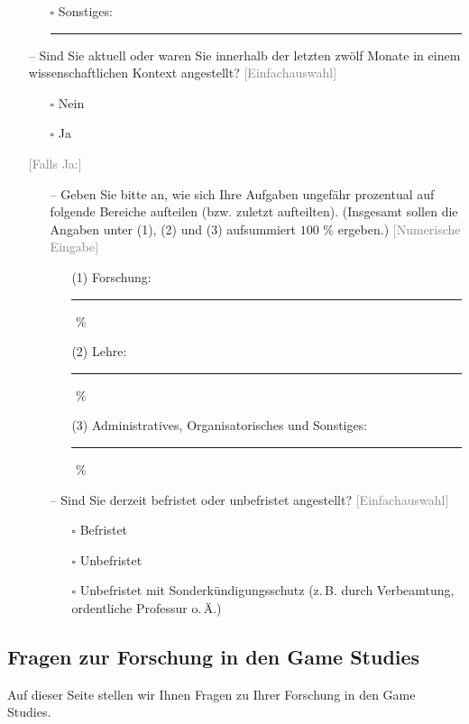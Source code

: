\documentclass{scrartcl}
\begin{document}
\begin{itemize}
\begin{itemize}
      \item[$\square$] Sonstiges:\ \rule{2cm}{0.4pt}
   \end{itemize}
   \item[--] Sind Sie aktuell oder waren Sie innerhalb der letzten zwölf Monate in einem wissenschaftlichen Kontext angestellt? \textcolor{gray}{\textsf{[Einfachauswahl]}}
   \begin{itemize}
      \item[$\square$] Nein
      \item[$\square$] Ja
   \end{itemize}
   \item[] \textcolor{gray}{\textsf{[Falls Ja:]}}
   \begin{itemize}
      \item[--] Geben Sie bitte an, wie sich Ihre Aufgaben ungefähr prozentual auf folgende Bereiche aufteilen (bzw. zuletzt aufteilten). (Insgesamt sollen die Angaben unter (1), (2) und (3) aufsummiert $100\,\,\%$ ergeben.) \textcolor{gray}{\textsf{[Numerische Eingabe]}}
      \begin{itemize}
         \item[(1)] Forschung:\ \rule{2cm}{0.4pt}\,$\,\%$
         \item[(2)] Lehre:\ \rule{2cm}{0.4pt}\,$\,\%$
         \item[(3)] Administratives, Organisatorisches und Sonstiges:\ \rule{2cm}{0.4pt}\,$\,\%$
      \end{itemize}
      \item[--] Sind Sie derzeit befristet oder unbefristet angestellt? \textcolor{gray}{\textsf{[Einfachauswahl]}}
      \begin{itemize}
         \item[$\square$] Befristet
         \item[$\square$] Unbefristet
         \item[$\square$] Unbefristet mit Sonderkündigungsschutz (z.\,B. durch Verbeamtung, ordentliche Professur o.\,Ä.)
      \end{itemize}
   \end{itemize}
\end{itemize}


\subsection*{Fragen zur Forschung in den Game Studies}
Auf dieser Seite stellen wir Ihnen Fragen zu Ihrer Forschung in den Game Studies.
\end{document}
